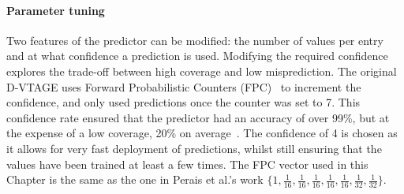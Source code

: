 \paragraph*{Parameter tuning}
Two features of the predictor can be modified: the number of values per entry and at what confidence a prediction is used.
Modifying the required confidence explores the trade-off between high coverage and low misprediction.
The original D-VTAGE uses Forward Probabilistic Counters (FPC)~\cite{riley2006fpc} to increment the confidence, and only used predictions once the counter was set to 7.
This confidence rate ensured that the predictor had an accuracy of over 99\%, but at the expense of a low coverage, 20\% on average~\cite{peraisBeBop2015}.
The confidence of 4 is chosen as it allows for very fast deployment of predictions, whilst still ensuring that the values have been trained at least a few times.
The FPC vector used in this Chapter is the same as the one in Perais et al.'s work $\{1,\frac{1}{16},\frac{1}{16},\frac{1}{16},\frac{1}{16},\frac{1}{16},\frac{1}{32},\frac{1}{32}\}$.
 



